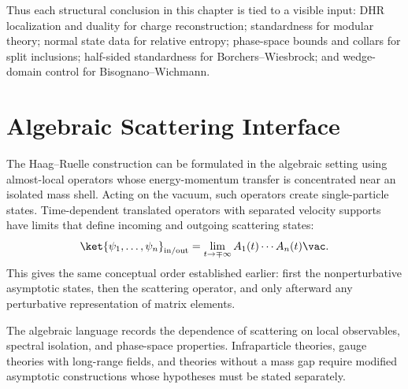 Thus each structural conclusion in this chapter is tied to a visible input:
DHR localization and duality for charge reconstruction; standardness for
modular theory; normal state data for relative entropy; phase-space bounds and
collars for split inclusions; half-sided standardness for
Borchers--Wiesbrock; and wedge-domain control for Bisognano--Wichmann.

\section{Algebraic Scattering Interface}

The Haag--Ruelle construction can be formulated in the algebraic setting using
almost-local operators whose energy-momentum transfer is concentrated near an
isolated mass shell.  Acting on the vacuum, such operators create
single-particle states.  Time-dependent translated operators with separated
velocity supports have limits that define incoming and outgoing scattering
states:
\[
  \ket{\psi_1,\ldots,\psi_n}_{\mathrm{in/out}}
  =
  \lim_{t\to\mp\infty}
  A_1(t)\cdots A_n(t)\vac .
\]
This gives the same conceptual order established earlier: first the
nonperturbative asymptotic states, then the scattering operator, and only
afterward any perturbative representation of matrix elements.

The algebraic language records the dependence of scattering on local
observables, spectral isolation, and phase-space properties.  Infraparticle
theories, gauge theories with long-range fields, and theories without a mass
gap require modified asymptotic constructions whose hypotheses must be stated
separately.
